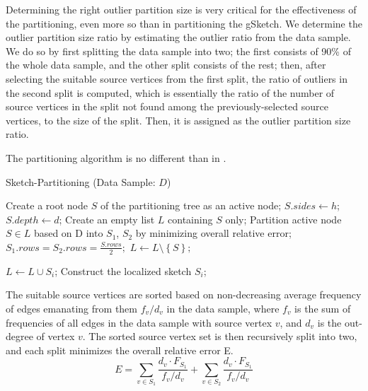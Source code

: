 Determining the right outlier partition size is very critical for the effectiveness of the partitioning, even more so than in partitioning the gSketch\cite{DBLP}. We determine the outlier partition size ratio by estimating the outlier ratio from the data sample. We do so by first splitting the data sample into two; the first consists of 90\% of the whole data sample, and the other split consists of the rest; then, after selecting the suitable source vertices from the first split, the ratio of outliers in the second split is computed, which is essentially the ratio of the number of source vertices in the split not found among the previously-selected source vertices, to the size of the split. Then, it is assigned as the outlier partition size ratio.

The partitioning algorithm is no different than in \cite{DBLP}. 

\begin{algorithm}
\caption{Sketch-Partitioning (Data Sample: $D$)}\label{euclid}
\begin{algorithmic}[1]

\State Create a root node $S$ of the partitioning tree as an
active node;
\State $S.sides \gets h$;
\State $S.depth \gets d$;
\State Create an empty list $L$ containing $S$ only;
\State Partition active node $S \in L$ based on D into $S_1$, $S_2$ by minimizing overall relative error;
\State $S_1.rows = S_2.rows = \frac{S.rows}{2};$
\State $L \gets L \setminus \left \{ S \right \};$
    
    \State $L \gets L \cup S_i$;
    \Else
    \State Construct the localized sketch $S_i$;
    
    \EndIf
\EndFor
\EndWhile

\end{algorithmic}
\end{algorithm}

The suitable source vertices are sorted based on non-decreasing average frequency of edges emanating from them $f_v/d_v$ in the data sample, where $f_v$ is the sum of frequencies of all edges in the data sample with source vertex $v$, and $d_v$ is the out-degree of vertex $v$. The sorted source vertex set is then recursively split into two, and each split minimizes the overall relative error E. \[E = \sum_{v \in S_1} \frac{d_v \cdot F_{S_1}}{f_v / d_v} + \sum_{v \in S_2} \frac{d_v \cdot F_{S_1}}{f_v / d_v}\]

